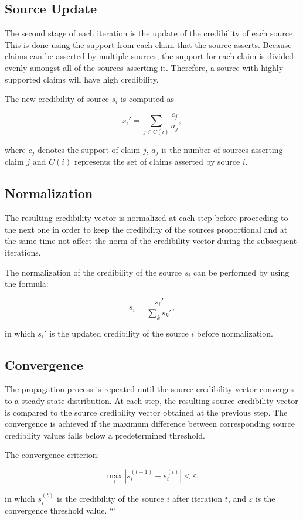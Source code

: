 \subsection{Source Update}

The second stage of each iteration is the update of the credibility of each source. This is done using the support from each claim that the source asserts. Because claims can be asserted by multiple sources, the support for each claim is divided evenly amongst all of the sources asserting it. Therefore, a source with highly supported claims will have high credibility.

The new credibility of source $s_i$ is computed as

\begin{equation}
s_i' =
\sum_{j \in C(i)}
\frac{c_j}{a_j},
\label{eq:source-update}
\end{equation}

where $c_j$ denotes the support of claim $j$, $a_j$ is the number of sources asserting claim $j$ and $C(i)$ represents the set of claims asserted by source $i$.

\subsection{Normalization}

The resulting credibility vector is normalized at each step before proceeding to the next one in order to keep the credibility of the sources proportional and at the same time not affect the norm of the credibility vector during the subsequent iterations.

The normalization of the credibility of the source $s_i$ can be performed by using the formula:

\begin{equation}
s_i =
\frac{s_i'}{\sum_{k} s_k'},
\label{eq:normalization}
\end{equation}

in which $s_i'$ is the updated credibility of the source $i$ before normalization.

\subsection{Convergence}

The propagation process is repeated until the source credibility vector converges to a steady-state distribution. At each step, the resulting source credibility vector is compared to the source credibility vector obtained at the previous step. The convergence is achieved if the maximum difference between corresponding source credibility values falls below a predetermined threshold.

The convergence criterion:

\begin{equation}
\max_i
\left|
s_i^{(t+1)}
-
s_i^{(t)}
\right|
<
\varepsilon,
\label{eq:convergence}
\end{equation}

in which $s_i^{(t)}$ is the credibility of the source $i$ after iteration $t$, and $\varepsilon$ is the convergence threshold value.
```
